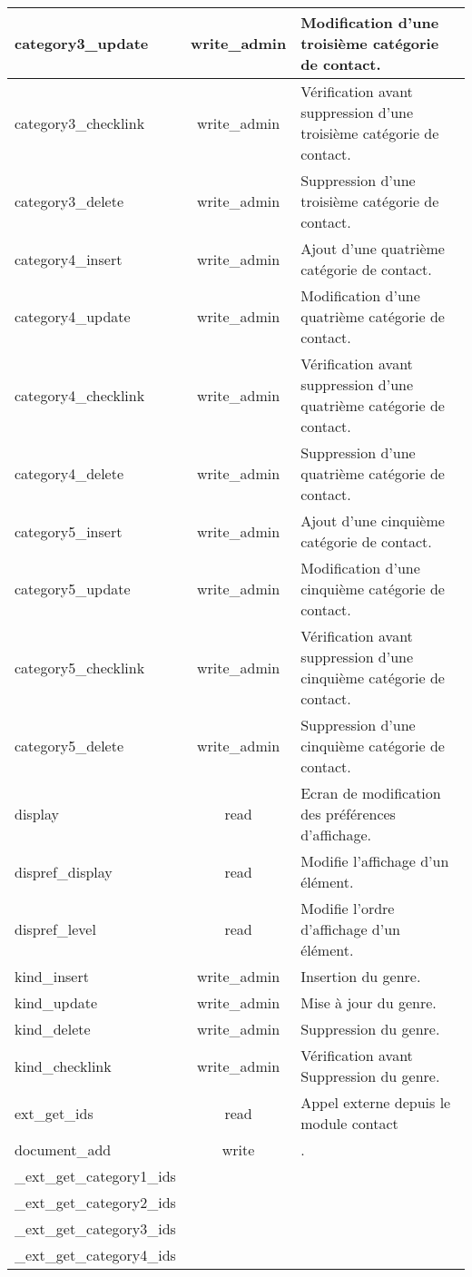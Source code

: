 \begin{tabular}{|l|c|p{9.5cm}|}
 \hline
  category3\_update & write\_admin & Modification d'une troisième catégorie de contact. \\
 \hline
  category3\_checklink & write\_admin & Vérification avant suppression d'une troisième catégorie de contact. \\
 \hline
  category3\_delete & write\_admin & Suppression d'une troisième catégorie de contact. \\
 \hline
  category4\_insert & write\_admin & Ajout d'une quatrième catégorie de contact. \\
 \hline
  category4\_update & write\_admin & Modification d'une quatrième catégorie de contact. \\
 \hline
  category4\_checklink & write\_admin & Vérification avant suppression d'une quatrième catégorie de contact. \\
 \hline
  category4\_delete & write\_admin & Suppression d'une quatrième catégorie de contact. \\
 \hline
  category5\_insert & write\_admin & Ajout d'une cinquième catégorie de contact. \\
 \hline
  category5\_update & write\_admin & Modification d'une cinquième catégorie de contact. \\
 \hline
  category5\_checklink & write\_admin & Vérification avant suppression d'une cinquième catégorie de contact. \\
 \hline
  category5\_delete & write\_admin & Suppression d'une cinquième catégorie de contact. \\
 \hline
  display & read & Ecran de modification des préférences d'affichage. \\
 \hline
  dispref\_display & read & Modifie l'affichage d'un élément. \\
 \hline
  dispref\_level & read & Modifie l'ordre d'affichage d'un élément. \\
 \hline
  kind\_insert & write\_admin & Insertion du genre. \\
 \hline
  kind\_update & write\_admin & Mise à jour du genre. \\
 \hline
  kind\_delete & write\_admin & Suppression du genre. \\
 \hline
  kind\_checklink & write\_admin & Vérification avant Suppression du genre. \\
 \hline
  ext\_get\_ids & read & Appel externe depuis le module contact \\
 \hline
  document\_add & write & . \\
 \hline
 \_ext\_get\_category1\_ids & &  \\
 \hline
 \_ext\_get\_category2\_ids & &  \\
 \hline
 \_ext\_get\_category3\_ids & &  \\
 \hline
 \_ext\_get\_category4\_ids & &  \\
 \hline
\end{tabular}
